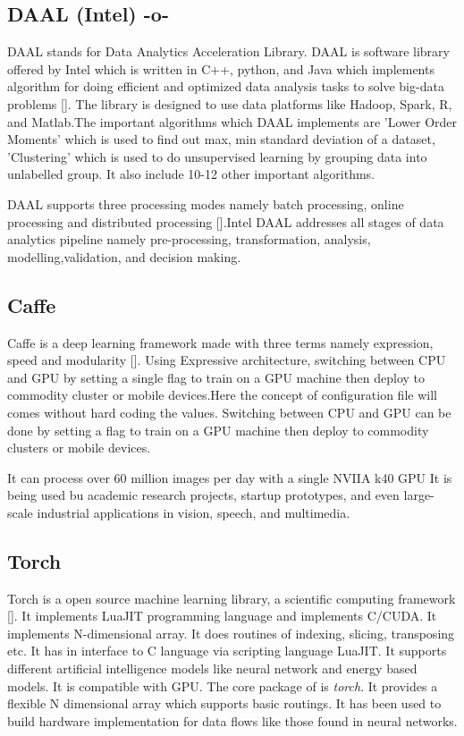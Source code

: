 \subsection{DAAL (Intel) -o-}

DAAL stands for Data Analytics Acceleration Library. DAAL is software
library offered by Intel which is written in C++, python, and Java
which implements algorithm for doing efficient and optimized data
analysis tasks to solve big-data problems [\cite{www-daal-wiki}]. The
library is designed to use data platforms like Hadoop, Spark, R, and
Matlab.The important algorithms which DAAL implements are 'Lower Order
Moments' which is used to find out max, min standard deviation of a
dataset, 'Clustering' which is used to do unsupervised learning by
grouping data into unlabelled group. It also include 10-12 other
important algorithms.

DAAL supports three processing modes namely batch processing, online
processing and distributed processing [\cite{www-daal-official}].Intel
DAAL addresses all stages of data analytics pipeline namely
pre-processing, transformation, analysis, modelling,validation, and
decision making.


    
    
\subsection{Caffe}

Caffe is a deep learning framework made with three terms namely
expression, speed and modularity [\cite{www-caffe}]. Using Expressive
architecture, switching between CPU and GPU by setting a single flag
to train on a GPU machine then deploy to commodity cluster or mobile
devices.Here the concept of configuration file will comes without hard
coding the values. Switching between CPU and GPU can be done by
setting a flag to train on a GPU machine then deploy to commodity
clusters or mobile devices.

It can process over 60 million images per day with a single NVIIA k40
GPU It is being used bu academic research projects, startup
prototypes, and even large-scale industrial applications in vision,
speech, and multimedia.
    
\subsection{Torch}

Torch is a open source machine learning library, a scientific
computing framework [\cite{www-torch}]. It implements LuaJIT
programming language and implements C/CUDA. It implements
N-dimensional array. It does routines of indexing, slicing,
transposing etc. It has in interface to C language via scripting
language LuaJIT. It supports different artificial intelligence models
like neural network and energy based models. It is compatible with
GPU.  The core package of is \textit{torch}. It provides a flexible N
dimensional array which supports basic routings. It has been used to
build hardware implementation for data flows like those found in
neural networks.
    

